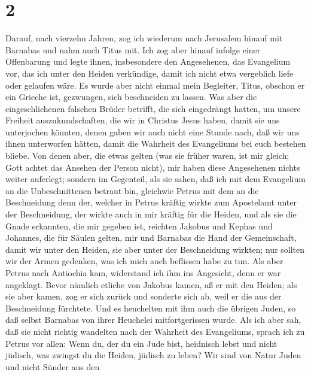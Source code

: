 \hypertarget{section-1}{%
\section{2}\label{section-1}}

 Darauf, nach vierzehn Jahren, zog ich wiederum nach
Jerusalem hinauf mit Barnabas und nahm auch Titus mit. 
Ich zog aber hinauf infolge einer Offenbarung und legte ihnen,
insbesondere den Angesehenen, das Evangelium vor, das ich unter den
Heiden verkündige, damit ich nicht etwa vergeblich liefe oder gelaufen
wäre.  Es wurde aber nicht einmal mein Begleiter, Titus,
obschon er ein Grieche ist, gezwungen, sich beschneiden zu lassen.
 Was aber die eingeschlichenen falschen Brüder betrifft,
die sich eingedrängt hatten, um unsere Freiheit auszukundschaften, die
wir in Christus Jesus haben, damit sie uns unterjochen könnten,
 denen gaben wir auch nicht eine Stunde nach, daß wir uns
ihnen unterworfen hätten, damit die Wahrheit des Evangeliums bei euch
bestehen bliebe.  Von denen aber, die etwas gelten (was
sie früher waren, ist mir gleich; Gott achtet das Ansehen der Person
nicht), mir haben diese Angesehenen nichts weiter auferlegt;
 sondern im Gegenteil, als sie sahen, daß ich mit dem
Evangelium an die Unbeschnittenen betraut bin, gleichwie Petrus mit dem
an die Beschneidung  denn der, welcher in Petrus kräftig
wirkte zum Apostelamt unter der Beschneidung, der wirkte auch in mir
kräftig für die Heiden,  und als sie die Gnade erkannten,
die mir gegeben ist, reichten Jakobus und Kephas und Johannes, die für
Säulen gelten, mir und Barnabas die Hand der Gemeinschaft, damit wir
unter den Heiden, sie aber unter der Beschneidung wirkten;
 nur sollten wir der Armen gedenken, was ich mich auch
beflissen habe zu tun.  Als aber Petrus nach Antiochia
kam, widerstand ich ihm ins Angesicht, denn er war angeklagt.
 Bevor nämlich etliche von Jakobus kamen, aß er mit den
Heiden; als sie aber kamen, zog er sich zurück und sonderte sich ab,
weil er die aus der Beschneidung fürchtete.  Und es
heuchelten mit ihm auch die übrigen Juden, so daß selbst Barnabas von
ihrer Heuchelei mitfortgerissen wurde.  Als ich aber sah,
daß sie nicht richtig wandelten nach der Wahrheit des Evangeliums,
sprach ich zu Petrus vor allen: Wenn du, der du ein Jude bist, heidnisch
lebst und nicht jüdisch, was zwingst du die Heiden, jüdisch zu leben?
 Wir sind von Natur Juden und nicht Sünder aus den
